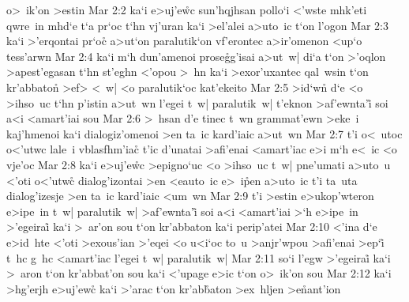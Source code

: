 o>~ik'on
>estin\bibvsend
\vs Mar 2:2
ka`i
e>uj'e\r{w}c
sun'hqjhsan
pollo`i
<'wste
mhk'eti
qwre~in
mhd`e
t`a
pr`oc
t`hn
vj'uran
ka`i
>el'alei
a>uto~ic
t`on
l'ogon\bibvsend
\vs Mar 2:3
ka`i
>'erqontai
pr`oc\r{}
a>ut`on
paralutik`on
vf'erontec
a>ir'omenon
<up`o
tess'arwn\bibvsend
\vs Mar 2:4
ka`i
m`h
dun'amenoi
prose\r{g}g'isai
a>ut~w|
di`a
t`on
>'oqlon
>apest'egasan
t`hn
st'eghn
<'opou
>~hn
ka`i
>exor'uxantec
qal~wsin
t`on
kr'abbaton\r{}
>ef>
<~w|
<o
paralutik`oc
kat'ekeito\bibvsend
\vs Mar 2:5
>id`wn\r{}
d`e
<o
>ihso~uc
t`hn
p'istin
a>ut~wn
l'egei
t~w|
paralutik~w|
t'eknon
>af'ewnta'i\r{}
soi
a<i
<amart'iai
sou\bibvsend
\vs Mar 2:6
>~hsan
d'e
tinec
t~wn
grammat'ewn
>eke~i
kaj'hmenoi
ka`i
dialogiz'omenoi
>en
ta~ic
kard'iaic
a>ut~wn\bibvsend
\vs Mar 2:7
t'i
o<~utoc
o<'utwc
lale~i
vblasfhm'ia\r{c}
t'ic
d'unatai
>afi'enai
<amart'iac
e>i
m`h
e<~ic
<o
vje'oc\bibvsend
\vs Mar 2:8
ka`i
e>uj'e\r{w}c
>epigno`uc
<o
>ihso~uc
t~w|
pne'umati
a>uto~u
<'oti
o<'utw\r{c}
dialog'izontai
>en
<eauto~ic
e>~i\r{p}en
a>uto~ic
t'i
ta~uta
dialog'izesje
>en
ta~ic
kard'iaic
<um~wn\bibvsend
\vs Mar 2:9
t'i
>estin
e>ukop'wteron
e>ipe~in
t~w|
paralutik~w|
>af'ewnta'i\r{}
soi
a<i
<amart'iai
>`h
e>ipe~in
>'egeirai\r{}
ka`i
>~ar'on
sou
t`on
kr'abbaton
ka`i
perip'atei\bibvsend
\vs Mar 2:10
<'ina
d`e
e>id~hte
<'oti
>exous'ian
>'eqei
<o
u<i`oc
to~u
>anjr'wpou
>afi'enai
>ep`i\r{}
t~hc
g~hc
<amart'iac
l'egei
t~w|
paralutik~w|\bibvsend
\vs Mar 2:11
so`i
l'egw
>'egeirai\r{}
ka`i
>~aron
t`on
kr'abbat'on
sou
ka`i
<'upage
e>ic
t`on
o>~ik'on
sou\bibvsend
\vs Mar 2:12
ka`i
>hg'erjh
e>uj'ewc\r{}
ka`i
>'arac
t`on
kr'ab\r{b}aton
>ex~hljen
>e\r{n}ant'ion
